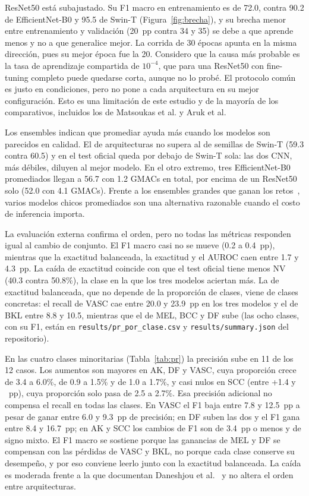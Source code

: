 \documentclass[conference]{IEEEtran}
\begin{document}
ResNet50 está subajustado. Su F1 macro en entrenamiento es de 72.0, contra 90.2 de EfficientNet-B0 y 95.5 de Swin-T (Figura~\ref{fig:brecha}), y su brecha menor entre entrenamiento y validación (20~pp contra 34 y 35) se debe a que aprende menos y no a que generalice mejor. La corrida de 30 épocas apunta en la misma dirección, pues su mejor época fue la 20. Considero que la causa más probable es la tasa de aprendizaje compartida de $10^{-4}$, que para una ResNet50 con fine-tuning completo puede quedarse corta, aunque no lo probé. El protocolo común es justo en condiciones, pero no pone a cada arquitectura en su mejor configuración. Esto es una limitación de este estudio y de la mayoría de los comparativos, incluidos los de Matsoukas et al. y Aruk et al.

Los ensembles indican que promediar ayuda más cuando los modelos son parecidos en calidad. El de arquitecturas no supera al de semillas de Swin-T (59.3 contra 60.5) y en el test oficial queda por debajo de Swin-T sola: las dos CNN, más débiles, diluyen al mejor modelo. En el otro extremo, tres EfficientNet-B0 promediados llegan a 56.7 con 1.2 GMACs en total, por encima de un ResNet50 solo (52.0 con 4.1 GMACs). Frente a los ensembles grandes que ganan los retos~\cite{gessert2020isic}, varios modelos chicos promediados son una alternativa razonable cuando el costo de inferencia importa.

La evaluación externa confirma el orden, pero no todas las métricas responden igual al cambio de conjunto. El F1 macro casi no se mueve (0.2 a 0.4~pp), mientras que la exactitud balanceada, la exactitud y el AUROC caen entre 1.7 y 4.3~pp. La caída de exactitud coincide con que el test oficial tiene menos NV (40.3 contra 50.8\%), la clase en la que los tres modelos aciertan más. La de exactitud balanceada, que no depende de la proporción de clases, viene de clases concretas: el recall de VASC cae entre 20.0 y 23.9~pp en los tres modelos y el de BKL entre 8.8 y 10.5, mientras que el de MEL, BCC y DF sube (las ocho clases, con su F1, están en \texttt{results/pr\_por\_clase.csv} y \texttt{results/summary.json} del repositorio).

En las cuatro clases minoritarias (Tabla~\ref{tab:pr}) la precisión sube en 11 de los 12 casos. Los aumentos son mayores en AK, DF y VASC, cuya proporción crece de 3.4 a 6.0\%, de 0.9 a 1.5\% y de 1.0 a 1.7\%, y casi nulos en SCC (entre +1.4 y ~pp), cuya proporción solo pasa de 2.5 a 2.7\%. Esa precisión adicional no compensa el recall en todas las clases. En VASC el F1 baja entre 7.8 y 12.5~pp a pesar de ganar entre 6.0 y 9.3~pp de precisión; en DF suben las dos y el F1 gana entre 8.4 y 16.7~pp; en AK y SCC los cambios de F1 son de 3.4~pp o menos y de signo mixto. El F1 macro se sostiene porque las ganancias de MEL y DF se compensan con las pérdidas de VASC y BKL, no porque cada clase conserve su desempeño, y por eso conviene leerlo junto con la exactitud balanceada. La caída es moderada frente a la que documentan Daneshjou et al.~\cite{daneshjou2022disparities} y no altera el orden entre arquitecturas.
\end{document}
